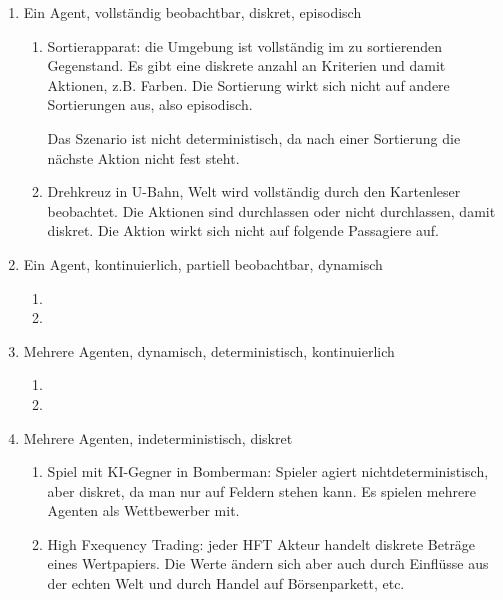 \begin{enumerate}
	\item Ein Agent, vollständig beobachtbar, diskret, episodisch
	\begin{enumerate}
		\item Sortierapparat: die Umgebung ist vollständig im zu sortierenden Gegenstand. Es gibt eine diskrete anzahl an Kriterien und damit Aktionen, z.B. Farben. Die Sortierung wirkt sich nicht auf andere Sortierungen aus, also episodisch.
		
		Das Szenario ist nicht deterministisch, da nach einer Sortierung die nächste Aktion nicht fest steht.
		
		\item Drehkreuz in U-Bahn, Welt wird vollständig durch den Kartenleser beobachtet. Die Aktionen sind durchlassen oder nicht durchlassen, damit diskret. Die Aktion wirkt sich nicht auf folgende Passagiere auf.
	\end{enumerate}
	
	\item Ein Agent, kontinuierlich, partiell beobachtbar, dynamisch
	\begin{enumerate}
		\item 
		
		\item 
	\end{enumerate}
	
	\item Mehrere Agenten, dynamisch, deterministisch, kontinuierlich
	\begin{enumerate}
		\item 
		
		\item 
	\end{enumerate}
	
	\item Mehrere Agenten, indeterministisch, diskret
	\begin{enumerate}
		\item Spiel mit KI-Gegner in Bomberman: Spieler agiert nichtdeterministisch, aber diskret, da man nur auf Feldern stehen kann. Es spielen mehrere Agenten als Wettbewerber mit.
		
		\item High Fxequency Trading: jeder HFT Akteur handelt diskrete Beträge eines Wertpapiers. Die Werte ändern sich aber auch durch Einflüsse aus der echten Welt und durch Handel auf Börsenparkett, etc.
	\end{enumerate}
	
\end{enumerate}